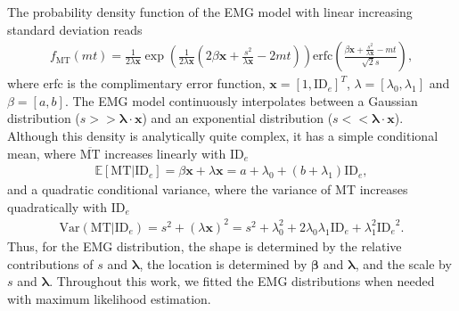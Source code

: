 \documentclass[acmlarge, manuscript,review]{acmart}
\newcommand{\mmt}{\ensuremath{\overline{\mt}}\xspace}
\newcommand{\mt}{\ensuremath{{\text{MT}}}\xspace}
\newcommand{\ide}{\ensuremath{{\text{ID}_e}}\xspace}
\begin{document}
The probability density function of the EMG model with linear increasing standard deviation reads
\begin{align}
	f_{\mt}(mt) = \frac{1}{2\lambda\mathbf{x}} \exp\left(\frac{1}{2\lambda\mathbf{x}}(2\beta\mathbf{x} + \frac{s^2}{\lambda\mathbf{x}} - 2mt)\right) \mathrm{erfc}\left(\frac{\beta\mathbf{x} + \frac{s^2}{\lambda\mathbf{x}} - mt}{\sqrt{2} s}\right),
\end{align}
where erfc is the complimentary error function, $\mathbf{x} = \left[1, \ide \right]^T$, $\lambda = \left[ \lambda_0, \lambda_1 \right]$ and $\beta = \left[ a, b\right]$. 
The EMG model continuously interpolates between a Gaussian distribution ($s >> \mathbf{\lambda} \cdot \mathbf{x} $) and an exponential distribution ($s <<  \mathbf{\lambda} \cdot \mathbf{x}$).
Although this density is analytically quite complex, it has a simple conditional mean, where \mmt increases linearly with \ide
\begin{align}
	\mathbb{E}[\mt|\ide] = \beta \mathbf{x} + \lambda \mathbf{x} = a + \lambda_0 + (b + \lambda_1) \ide, \label{eq:emg_mean}
\end{align}
and a quadratic conditional variance, where the variance of MT increases quadratically with \ide
\begin{align}
	\text{Var}(\mt|\ide) = s^2 + (\lambda \mathbf{x})^2 = s^2 + \lambda_0^2 + 2\lambda_0\lambda_1\ide + \lambda_1^2\ide^2. \label{eq:emg_conditional_variance}
\end{align}
Thus, for the EMG distribution, the shape is determined by the relative contributions of $s$ and $ \mathbf{\lambda}$, the location is determined by $\mathbf{\beta}$ and $\mathbf{\lambda}$, and the scale by $s$ and $ \mathbf{\lambda}$. Throughout this work, we fitted the EMG distributions when needed with maximum likelihood estimation. 





\end{document}
